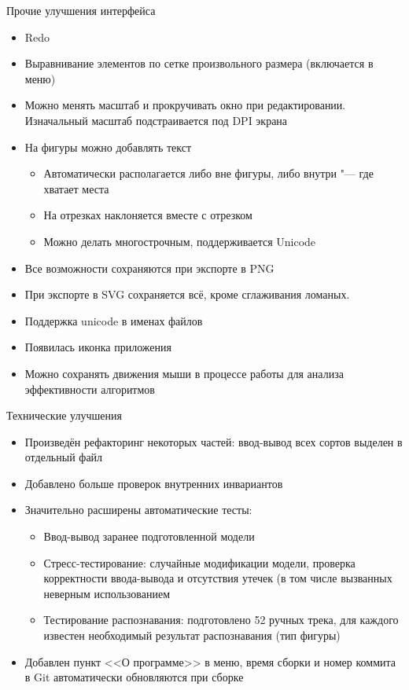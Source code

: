 \documentclass[utf8,xcolor=table]{beamer}
\renewcommand{\t}[1]{\ifmmode{\mathtt{#1}}\else{\texttt{#1}}\fi}
\begin{document}
\begin{frame}[t]{Прочие улучшения интерфейса}
  \begin{itemize}
  \item Redo
  \item Выравнивание элементов по сетке произвольного размера (включается в меню)
  \item Можно менять масштаб и прокручивать окно при редактировании. Изначальный масштаб подстраивается под DPI экрана
  \item На фигуры можно добавлять текст
    \begin{itemize}
    \item Автоматически располагается либо вне фигуры, либо внутри "--- где хватает места
    \item На отрезках наклоняется вместе с отрезком
    \item Можно делать многострочным, поддерживается Unicode
    \end{itemize}
  \item Все возможности сохраняются при экспорте в PNG
  \item При экспорте в SVG сохраняется всё, кроме сглаживания ломаных.
  \item Поддержка unicode в именах файлов
  \item Появилась иконка приложения
  \item Можно сохранять движения мыши в процессе работы для анализа эффективности алгоритмов
  \end{itemize}
\end{frame}

\begin{frame}[t]{Технические улучшения}
  \begin{itemize}
  \item Произведён рефакторинг некоторых частей: ввод-вывод всех сортов выделен в отдельный файл
  \item Добавлено больше проверок внутренних инвариантов
  \item Значительно расширены автоматические тесты:
    \begin{itemize}
    \item Ввод-вывод заранее подготовленной модели
    \item Стресс-тестирование: случайные модификации модели, проверка корректности ввода-вывода и отсутствия утечек (в том числе вызванных неверным использованием \t{shared\_ptr}
    \item Тестирование распознавания: подготовлено 52 ручных трека, для каждого известен необходимый результат распознавания (тип фигуры)
    \end{itemize}
  \item Добавлен пункт <<О программе>> в меню, время сборки и номер коммита в Git автоматически обновляются при сборке
  \end{itemize}
\end{frame}
\end{document}
